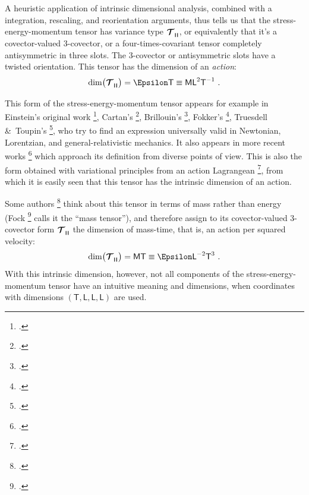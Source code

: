\documentclass[\ifafour a4paper,12pt,\else a5paper,10pt,\fi%
onecolumn,oneside,article,%
british%
]{memoir}
\makeatletter
\theoremstyle{remark}
\theoremstyle{innote}
\newcommand*{\mathte}[1]{\textbf{\textit{\textsf{#1}}}}
\newcommand*{\citep}{\footcites}
\newcommand*{\amp}{\&}
\renewcommand*{\|}[1][]{\nonscript\,#1\vert\nonscript\;\mathopen{}}
\newcommand*{\sect}{\S}%
\newcommand*{\chap}{ch.}%
\newcommand*{\eg}{{e.g.}}
\newcommand*{\cf}{{cf.}}
\newcommand*{\q}{}%
\DeclareRobustCommand*{\q}{%
  \mathbin{\mathpalette\bigcdot@{}}%
}
\newcommand*{\bigcdot@scalefactor}{0.7}
\newcommand*{\bigcdot@widthfactor}{1.5}
\newcommand*{\bigcdot@}[2]{%
  \sbox0{$#1\vcenter{}$}%
  \sbox2{$#1\cdot\m@th$}%
  \hbox to \bigcdot@widthfactor\wd2{%
    \hfil
    \raise\ht0\hbox{%
      \scalebox{\bigcdot@scalefactor}{%
        \lower\ht0\hbox{$#1\bullet\m@th$}%
      }%
    }%
    \hfil
  }%
}
\newcommand*{\Le}{\textsf{L}}
\newcommand*{\Ti}{\textsf{T}}
\newcommand*{\Ma}{\textsf{M}}
\newcommand*{\En}{\Epsilon}%
\newcommand*{\yT}{\bm{\mathcal{T}}}
\renewcommand*{\i}{\indices}
\newcommand*{\rul}{{\mkern2mu\rule[-0.1ex]{0.75pt}{1.1ex}\mkern2mu}}
\DeclarePairedDelimiter\mul{\rul}{\rul}%
\makeatother
\begin{document}
A heuristic application of intrinsic dimensional analysis, combined with a
integration, rescaling, and reorientation arguments, thus tells us that the
stress-energy-momentum tensor has variance type $\yT\i{_{\q\mul{\q\q\q}}}$,
or equivalently that it's a covector-valued 3-covector, or a
four-times-covariant tensor completely antisymmetric in three slots. The
3-covector or antisymmetric slots have a twisted orientation. This tensor
has the dimension of an \emph{action}:
\begin{equation}
    \label{eq:final_dim_T}
  \dim\bigl(\yT\i{_{\q \mul{\q\q\q}}}\bigr) = \En\Ti \equiv \Ma\Le^{2}\Ti^{-1} \ .
\end{equation}


\medskip

This form of the stress-energy-momentum tensor appears for example in
Einstein's original work \citep[\sect~C.9]{einstein1914b}, Cartan's
\citep[\sect~13]{cartan1923}, Brillouin's
\citep[\cf][\sect~7]{brillouin1924}, Fokker's
\citep[\sect~VII.2]{fokker1960_t1965}, Truesdell \amp\ Toupin's
\citep[\sect~F.IV.288]{truesdelletal1960}, who try to find an expression
universally valid in Newtonian, Lorentzian, and general-relativistic
mechanics. It also appears in more recent works
\citep[\chap~14 Exercise~14.18,
\chap~15]{misneretal1970_r1973}{hehletal1986}{gronwaldetal1997}[\cf\
also][]{segev1986,segevetal1999,segev2000,segev2000b,segev2002,kansoetal2007}
which approach its definition from diverse points of view. This is also the
form obtained with variational principles from an action Lagrangean
\citep[\sect~21.3]{misneretal1970_r1973}[\sect~3.3]{hawkingetal1973_r1994}[\sect~IV.55]{pauli1921_t1958}[see
also][\sect~VII.8]{fokker1960_t1965}{gotayetal1992}, from which it is
easily seen that this tensor has the intrinsic dimension of an action.


Some authors
\citep[\eg][\sect~V.55]{fock1955_t1964}[\sect~4.1]{mcvittie1956_r1965}[\sect~10.1]{adleretal1965_r1975}
think about this tensor in terms of mass rather than energy (Fock
\citep[\sect~II.31]{fock1955_t1964} calls it the \enquote{mass tensor}),
and therefore assign to its covector-valued 3-covector form
$\yT\i{_{\q \mul{\q\q\q}}}$ the dimension of mass-time, that is, an action
per squared velocity:
\begin{equation}
  \label{eq:final_dim_T_MT}
  \dim\bigl(\yT\i{_{\q \mul{\q\q\q}}}\bigr) = \Ma\Ti \equiv \En\Le^{-2}\Ti^{3} \ .
\end{equation}
With this intrinsic dimension, however, not all components of the
stress-energy-momentum tensor have an intuitive meaning and dimensions,
when coordinates with dimensions $(\Ti,\Le,\Le,\Le)$ are used.
\end{document}

